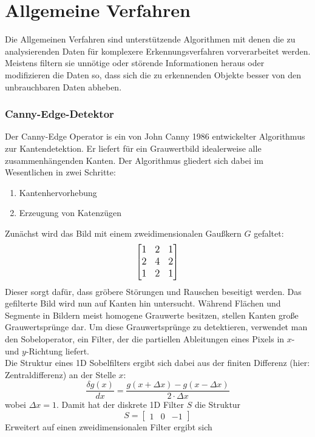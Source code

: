 
\chapter{Allgemeine Verfahren}
\label{chap:k3}
Die Allgemeinen Verfahren sind unterstützende Algorithmen mit denen die zu analysierenden Daten für komplexere Erkennungsverfahren vorverarbeitet werden. Meistens filtern sie unnötige oder störende Informationen heraus oder modifizieren die Daten so, dass sich die zu erkennenden Objekte besser von den unbrauchbaren Daten abheben.
	\subsection {Canny-Edge-Detektor}
\cite{Canny1986}
		Der Canny-Edge Operator is ein von John Canny 1986 entwickelter Algorithmus zur Kantendetektion. Er liefert für ein Grauwertbild idealerweise alle zusammenhängenden Kanten. Der Algorithmus gliedert sich dabei im Wesentlichen in zwei Schritte:
\begin{enumerate}
	\item Kantenhervorhebung
	\item Erzeugung von Katenzügen
\end{enumerate}

Zunächst wird das Bild mit einem zweidimensionalen Gaußkern $G$ gefaltet:
{\[\large \begin{bmatrix}
1 & 2 & 1\\ 
2 & 4 & 2 \\ 
1 & 2 & 1
\end{bmatrix}\]}
Dieser sorgt dafür, dass gröbere Störungen und Rauschen beseitigt werden.
Das gefilterte Bild wird nun auf Kanten hin untersucht. Während Flächen und Segmente in Bildern meist homogene Grauwerte besitzen, stellen Kanten große Grauwertsprünge dar. Um diese Grauwertsprünge zu detektieren, verwendet man den Sobeloperator, ein Filter, der die partiellen Ableitungen eines Pixels in $x$- und $y$-Richtung liefert. \\
Die Struktur eines 1D Sobelfilters ergibt sich dabei aus der finiten Differenz (hier: Zentraldifferenz) an der Stelle $x$:
\begin{equation*}
\frac{\delta g(x)}{dx} = \frac{g(x + \Delta x) - g(x - \Delta x)}{2 \cdot \Delta x }
\end{equation*}
wobei $\Delta x = 1$. Damit hat der diskrete 1D Filter $S$ die Struktur
\begin{equation*}
S = \begin{bmatrix}
1 & 0 & -1
\end{bmatrix}
\end{equation*}
Erweitert auf einen zweidimensionalen Filter ergibt sich

